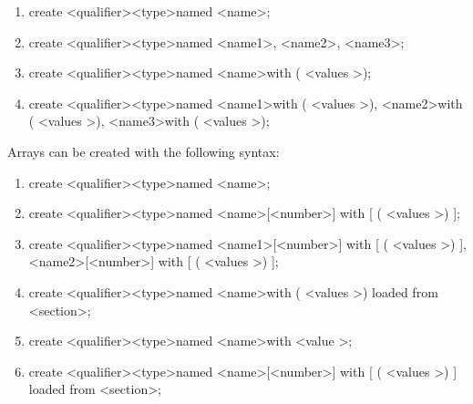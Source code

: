 \documentclass[12pt]{article}
\begin{document}
\begin{enumerate}


\item create \textless qualifier\textgreater  \space \textless type\textgreater \space named \textless name\textgreater;

\item create \textless qualifier\textgreater  \space \textless type\textgreater \space named \textless name1\textgreater , \textless name2\textgreater , \textless name3\textgreater;

\item create \textless qualifier\textgreater  \space \textless type\textgreater \space named \textless name\textgreater with ( \textless values \textgreater );

\item create \textless qualifier\textgreater  \space \textless type\textgreater \space named \textless name1\textgreater \space  with ( \textless values \textgreater ), \textless name2\textgreater \space  with ( \textless values \textgreater ), \textless name3\textgreater \space  with ( \textless values \textgreater );

\end{enumerate}

Arrays can be created with the following syntax:

\begin{enumerate}

\item create \textless qualifier\textgreater \space \textless type\textgreater \space [ ] named \textless name\textgreater;

\item create \textless qualifier\textgreater \space \textless type\textgreater \space [ ] named \textless name\textgreater [\textless number\textgreater] with [ ( \textless values \textgreater ) ];

\item create \textless qualifier\textgreater \space \textless type\textgreater \space [ ] named \textless name1\textgreater [\textless number\textgreater] with [ ( \textless values \textgreater ) ], \textless name2\textgreater [\textless number\textgreater] with [ ( \textless values \textgreater ) ];

\item create \textless qualifier\textgreater  \space \textless type\textgreater \space named \textless name\textgreater with ( \textless values \textgreater ) loaded from \textless section\textgreater;

\item create \textless qualifier\textgreater  \space \textless type\textgreater \space named \textless name\textgreater with \textless value \textgreater;

\item create \textless qualifier\textgreater \space \textless type\textgreater \space [ ] named \textless name\textgreater [\textless number\textgreater] with [ ( \textless values \textgreater ) ] loaded from \textless section\textgreater;
\end{enumerate}
\end{document}
